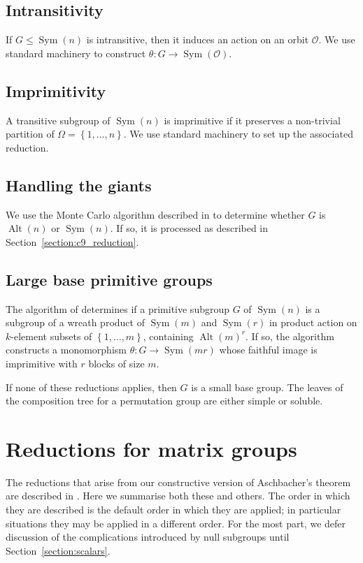 \documentclass[12pt,twoside,reqno,psamsfonts]{amsproc}
\newcommand{\nullsubgp}{{null subgroup}\xspace}
\numberwithin{equation}{section}
\numberwithin{figure}{section}
\newcounter{algorithm}
\theoremstyle{plain}
\theoremstyle{definition}
\theoremstyle{remark}
\providecommand{\set}[1]{\left\lbrace #1 \right\rbrace}
\providecommand{\Sym}[1]{\operatorname{Sym}( #1 )}
\providecommand{\Alt}[1]{\operatorname{Alt}( #1 )}
\begin{document}
\subsection{Intransitivity}
If $G \leqslant \Sym{n}$ is intransitive, then it
induces an action on an orbit $\mathcal{O}$. 
We use standard machinery 
to construct $\theta : G \to \Sym{\mathcal{O}}$. 

\subsection{Imprimitivity}
A transitive subgroup of $\Sym{n}$ is
imprimitive if it preserves a non-trivial partition of
$\Omega = \set{1, \dotsc, n}$. We use standard machinery 
to set up the associated reduction. 

\subsection{Handling the giants}
We use the Monte Carlo algorithm described in  
\cite[\S 10.2]{seress03} 
to determine whether $G$ is $\Alt{n}$ or $\Sym{n}$.
If so, it is processed as described in Section~\ref{section:c9_reduction}.

\subsection{Large base primitive groups}
The algorithm of \cite{jellyfish} determines if a primitive
subgroup $G$ of $\Sym{n}$ is a
subgroup of a wreath product of $\Sym{m}$ and $\Sym{r}$ in product
action on $k$-element subsets of $\set{1, \dotsc, m}$, containing
$\Alt{m}^r$. If so, the algorithm constructs a monomorphism $\theta : G \to
\Sym{mr}$ whose faithful image is imprimitive with $r$ blocks of size $m$. 

\vspace*{0.1cm}
If none of these reductions applies, then $G$ is a small base group.
The leaves of the composition tree for a permutation group are 
either simple or soluble. 

\section{Reductions for matrix groups}
\label{section:matrix_reductions}

The reductions that arise from our constructive
version of Aschbacher's theorem are described in
\cite{crlg01, MR2258009}. 
Here we summarise both these and others. 
The order in which they are described is the default order 
in which they are applied; in particular situations 
they may be applied in a different order.
For the most part, we defer discussion of the complications introduced by
{\nullsubgp}s until Section~\ref{section:scalars}.
\end{document}
